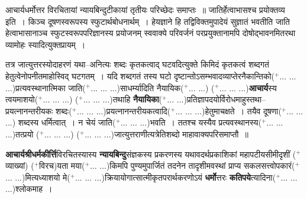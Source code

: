 \documentclass[article,12pt,a4paper]{memoir}
\newcommand{\add}[1]{($^{+}$#1)}
\begin{document}
	आचार्यधर्मोत्तर विरचितायां न्यायबिन्दुटीकायां तृतीयः परिच्छेदः समाप्तः ॥ जातिर्हेत्वाभासश्च प्रयोक्तव्य इति । किञ्च दूषणस्वरूपस्य स्फुटार्थबोधनार्थम् । हेयज्ञाने हि तद्विविक्तमुपादेयं सुज्ञातं भवतीति जाति  हेत्वाभासानाञ्च स्फुटस्वरूपपरिज्ञानस्य प्रयोजनम् स्ववाक्ये परिवर्जनं परप्रयुक्तानामपि दोषोद्भावनमितरथा व्यामोहः स्यादित्युक्तप्रायम् ।
	\pend
      

	  \pstart तत्र जात्युत्तरस्योदाहरणं यथा--अनित्यः शब्दः कृतकत्वाद् घटवदित्युक्ते किमिदं कृतकत्वं शब्दगतं हेतुत्वेनोपनीतमाहोस्विद् घटगतम् । यदि शब्दगतं तस्य घटो दृष्टान्तोऽसम्भवादव्याप्तेरनैकान्तिको\add{... ... ...}प्रत्यवस्थानात्मिका जाति\add{... ... ...}साधर्म्यादिति नैयायिक\add{... ...} \add{... ... ...}\textbf{आचार्य}स्य त्वयमाशयो\add{... ... ...} \add{... ... ...}तथाहि \textbf{नैयायिका}\add{... ...}प्रतिज्ञापदयोर्विरोधमाहुस्तथा--प्रयत्नानन्तरीयकः शब्दः\add{... ... ...}प्रयत्नानन्तरीयकत्वादि\add{... ... ...}हेतुमाचक्षते । तयैव दूषणा\add{... ... ...} शब्दस्य धर्मित्वात् । न चेयं जाति\add{... ... ...}भवति । ततश्च यस्यैव प्रत्यवस्थानस्य\add{... ... ...}तत्प्रयो \add{... ... ...} \add{... ... ...}जात्युत्तराणीत्यत्रेतिशब्दो माहावाक्यपरिसमाप्तौ ॥
	\pend

	  \pstart \textbf{आचार्यश्रीधर्मकीर्त्ति}विरचितस्यास्य \textbf{न्यायबिन्दु}संज्ञकस्य प्रकरणस्य यथावदर्थप्रकाशिकां महापटीयसीमीदृशीं \add{व्याख्यां} \add{विरच}यता मया\add{... ...}किमपि पुण्यमुपार्जितं तदनेन तादृशीमवस्थां प्राप्य सकलसत्त्वोपकारं\add{... ...}मित्यध्याशयो मे\add{... ... ...}क्रियायोगात्सात्मीकृतपरार्थकरणोऽयं \textbf{धर्मो}त्तरः \textbf{कतिपये}त्यादिना\add{... ... ...}श्लोकमाह ।
	\pend
      
\end{document}
